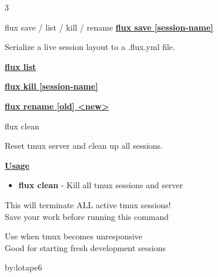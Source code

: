 \documentclass[10pt,a4paper]{article}
\begin{document}
\begin{multicols}{3}
\begin{textbox}{flux save / list / kill / rename}
\underline{\textbf{flux save [session-name]}}

Serialize a live session layout to a .flux.yml file.


\underline{\textbf{flux list}}


\underline{\textbf{flux kill [session-name]}}


\underline{\textbf{flux rename [old] \textless new\textgreater}}


\end{textbox}

\begin{textbox}{flux clean}

Reset tmux server and clean up all sessions.

\underline{\textbf{Usage}}
\begin{itemize}
    \item \textbf{flux clean} - Kill all tmux sessions and server
\end{itemize}


This will terminate ALL active tmux sessions!\\

Save your work before running this command\\


Use when tmux becomes unresponsive\\

Good for starting fresh development sessions\\

\end{textbox}

\vfill\null
\columnbreak

\centering
\vspace{6pt}
by:\Large \color{greenbash}lotape6 \scriptsize


\end{multicols}
\end{document}
